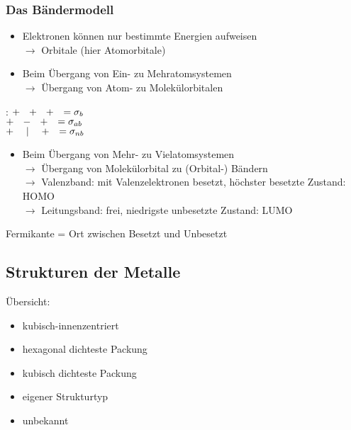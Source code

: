 \documentclass{article}
\begin{document}
\subsubsection{Das Bändermodell}
\begin{itemize}
    \item Elektronen können nur bestimmte Energien aufweisen\\$\rightarrow$ Orbitale (hier Atomorbitale)
    \item Beim Übergang von Ein- zu Mehratomsystemen\\$\rightarrow$ Übergang von Atom- zu Molekülorbitalen
\end{itemize}
: $+\hspace*{0.25cm}+\hspace*{0.25cm}+\hspace*{0.25cm} = \sigma_b$\\
\hspace*{0.85cm}$+\hspace*{0.25cm}-\hspace*{0.25cm}+\hspace*{0.25cm} = \sigma_{ab}$\\
\hspace*{0.85cm}$+\hspace*{0.45cm}|\hspace*{0.45cm}+\hspace*{0.25cm} = \sigma_{nb}$
\begin{itemize}
    \item Beim Übergang von Mehr- zu Vielatomsystemen\\$\rightarrow$ Übergang von Molekülorbital zu (Orbital-) Bändern\\$\rightarrow$ Valenzband: mit Valenzelektronen besetzt, höchster besetzte Zustand: HOMO\\$\rightarrow$ Leitungsband: frei, niedrigste unbesetzte Zustand: LUMO
\end{itemize}
Fermikante = Ort zwischen Besetzt und Unbesetzt\\
\subsection{Strukturen der Metalle}
Übersicht:
\begin{itemize}
    \item kubisch-innenzentriert
    \item hexagonal dichteste Packung
    \item kubisch dichteste Packung
    \item eigener Strukturtyp
    \item unbekannt
\end{itemize}
\end{document}
